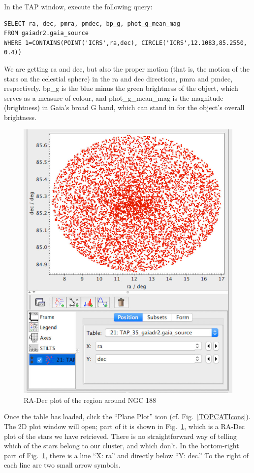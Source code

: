 \documentclass[twocolumn,apj]{openjournal}
\begin{document}
In the TAP window, execute the following query:
\begin{lstlisting}
SELECT ra, dec, pmra, pmdec, bp_g, phot_g_mean_mag
FROM gaiadr2.gaia_source
WHERE 1=CONTAINS(POINT('ICRS',ra,dec), CIRCLE('ICRS',12.1083,85.2550, 0.4))
\end{lstlisting}
We are getting ra and dec, but also the proper motion (that is, the motion of the stars on the celestial sphere) in the ra and dec directions, pmra and pmdec, respectively. bp\_g is the blue minus the green brightness of the object, which serves as a measure of colour, and phot\_g\_mean\_mag is the magnitude (brightness) in Gaia's broad G band, which can stand in for the object's overall brightness. 
\begin{figure}[htbp]
\begin{center}
\includegraphics[width=\linewidth]{ngc188plot.jpg}
\caption{RA-Dec plot of the region around NGC 188}
\label{NGC188Plot}
\end{center}
\end{figure}
Once the table has loaded, click the ``Plane Plot'' icon (cf. Fig.~\ref{TOPCATIcons}). The 2D plot window will open; part of it is shown in Fig.~\ref{NGC188Plot}, which is a RA-Dec plot of the stars we have retrieved. There is no straightforward way of telling which of the stars belong to our cluster, and which don't. In the bottom-right part of Fig.~\ref{NGC188Plot}, there is a line ``X: ra'' and directly below ``Y: dec.'' To the right of each line are two small arrow symbols. 
\end{document}
